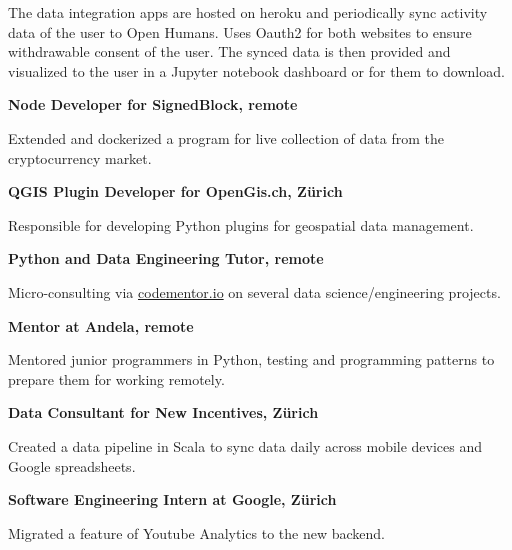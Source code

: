 \documentclass[9pt]{article} %
\begin{document}
\begin{minipage}[t]{0.5\textwidth}
{The data integration apps are hosted on heroku and periodically sync activity data of the user to Open Humans. Uses Oauth2 for both websites to ensure withdrawable consent of the user. The synced data is then provided and visualized to the user in a Jupyter notebook dashboard or for them to download.}
\\

{\raggedright\large \textbf{Node Developer for SignedBlock, remote}\\
}

\normalsize{Extended and dockerized a program for live collection of data from the cryptocurrency market.}
\\

{\raggedright\large \textbf{QGIS Plugin Developer for OpenGis.ch, Z\"urich}\\
}

\normalsize{Responsible for developing Python plugins for geospatial data management.}\\

{\raggedright\large \textbf{Python and Data Engineering Tutor, remote}\\
}

\normalsize{Micro-consulting via \href{http://www.codementor.io/carolinux}{codementor.io} on several data science/engineering projects.}\\

{\raggedright\large \textbf{Mentor at Andela, remote}\\
}

\normalsize{Mentored junior programmers in Python, testing and programming patterns to prepare them for working remotely.} 
\\

{\raggedright\large \textbf{Data Consultant for New Incentives, Z\"urich}\\
}

\normalsize{Created a data pipeline in Scala to sync data daily across mobile devices and Google spreadsheets.}\\

{\raggedright\large \textbf{Software Engineering Intern at Google, Z\"urich}\\
}

\normalsize{Migrated a feature of Youtube Analytics to the new backend.}\\



\end{minipage}
\end{document}
